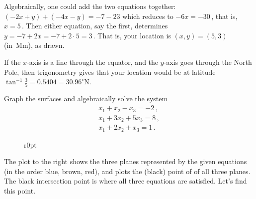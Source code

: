\begin{example}
\begin{solution}
Algebraically, one could add the two equations together: \((-2x+y)+(-4x-y)=-7-23\) which reduces to \(-6x=-30\)\,, that is, \(x=5\)\,.
Then either equation, say the first, determines~\(y=-7+2x=-7+2\cdot 5=3\)\,.  
That is, your location is \((x,y)=(5,3)\) (in~Mm), as drawn.
\end{solution}

If the \(x\)-axis is a line through the equator, and the \(y\)-axis goes through the North Pole, then trigonometry gives that your location would be at latitude
\(\tan^{-1}\frac35=0.5404=30.96^\circ\)N.
\end{example}





\begin{example} 
\label{eg:3eq3var}
Graph the surfaces and algebraically solve the system
\begin{equation*}
\begin{array}{l}
x_1+x_2-x_3=-2\,,\\
x_1+3x_2+5x_3=8\,,\\
x_1+2x_2+x_3=1\,.
\end{array}
\end{equation*}

\begin{solution} 
\begin{figure}[8]r{0pt}
\end{figure}
The plot to the right shows the three planes represented by the given equations (in the order blue, brown, red), and plots the (black) point of  of all three planes.
The black intersection point is where all three equations are satisfied.
Let's find this point.


\end{solution}
\end{example}
